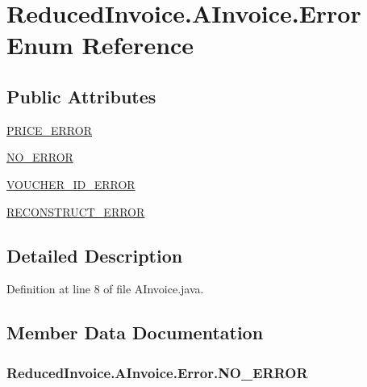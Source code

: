 \hypertarget{enum_reduced_invoice_1_1_a_invoice_1_1_error}{}\section{Reduced\+Invoice.\+A\+Invoice.\+Error Enum Reference}
\label{enum_reduced_invoice_1_1_a_invoice_1_1_error}
\subsection*{Public Attributes}
\begin{DoxyCompactItemize}
\item 
\hyperlink{enum_reduced_invoice_1_1_a_invoice_1_1_error_a5c521b3b1cc9827b5dba56d42a770481}{P\+R\+I\+C\+E\+\_\+\+E\+R\+R\+OR}
\item 
\hyperlink{enum_reduced_invoice_1_1_a_invoice_1_1_error_ab758351b18ce3163abca9924287fc6df}{N\+O\+\_\+\+E\+R\+R\+OR}
\item 
\hyperlink{enum_reduced_invoice_1_1_a_invoice_1_1_error_aac88b1b92765c5fdea043f9c9aeeb701}{V\+O\+U\+C\+H\+E\+R\+\_\+\+I\+D\+\_\+\+E\+R\+R\+OR}
\item 
\hyperlink{enum_reduced_invoice_1_1_a_invoice_1_1_error_af28e1c7484bcb6f47f70a00e9dd81671}{R\+E\+C\+O\+N\+S\+T\+R\+U\+C\+T\+\_\+\+E\+R\+R\+OR}
\end{DoxyCompactItemize}


\subsection{Detailed Description}


Definition at line 8 of file A\+Invoice.\+java.



\subsection{Member Data Documentation}
\subsubsection[{\texorpdfstring{N\+O\+\_\+\+E\+R\+R\+OR}{NO_ERROR}}]{\setlength{\rightskip}{0pt plus 5cm}Reduced\+Invoice.\+A\+Invoice.\+Error.\+N\+O\+\_\+\+E\+R\+R\+OR}\hypertarget{enum_reduced_invoice_1_1_a_invoice_1_1_error_ab758351b18ce3163abca9924287fc6df}{}\label{enum_reduced_invoice_1_1_a_invoice_1_1_error_ab758351b18ce3163abca9924287fc6df}


